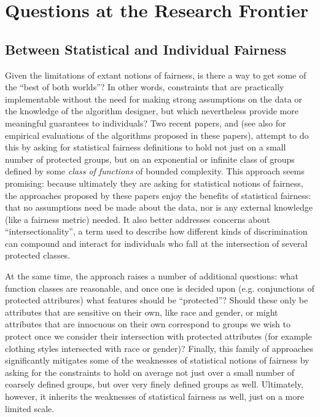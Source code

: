 \section{Questions at the Research Frontier}

\subsection{Between Statistical and Individual Fairness}
Given the limitations of extant notions of fairness, is there a way to get some of the ``best of both worlds''? In other words, constraints that are practically implementable without the need for making strong assumptions on the data or the knowledge of the algorithm designer, but which nevertheless provide more meaningful guarantees to individuals? Two recent papers, \cite{gerrymandering} and \cite{multical} (see also \cite{gerrymandering2,multical2} for empirical evaluations of the algorithms proposed in these papers), attempt to do this by asking for statistical fairness definitions to hold not just on a small number of protected groups, but on an exponential or infinite class of groups defined by some \emph{class of functions} of bounded complexity. This approach seems promising: because ultimately they are asking for statistical notions of fairness, the approaches proposed by these papers enjoy the benefits of statistical fairness: that no assumptions need be made about the data, nor is any external knowledge (like a fairness metric) needed.  It also better addresses concerns about ``intersectionality'', a term used to describe how different kinds of discrimination can compound and interact for individuals who fall at the intersection of several protected classes.

At the same time, the approach raises a number of additional questions: what function classes are reasonable, and once one is decided upon (e.g. conjunctions of protected attribures) what features should be ``protected''? Should these only be attributes that are sensitive on their own, like race and gender, or might attributes that are innocuous on their own correspond to groups we wish to protect once we consider their intersection with protected attributes (for example clothing styles intersected with race or gender)? Finally, this family of approaches significantly mitigates  some of the weaknesses of statistical notions of fairness by asking for the constraints to hold on average not just over a small number of coarsely defined groups, but over very finely defined groups as well. Ultimately, however, it inherits the weaknesses of statistical fairness as well, just on a more limited scale.

